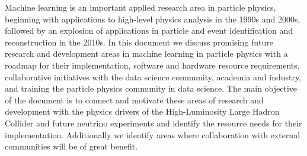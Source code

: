 Machine learning is an important applied research area in particle physics, beginning with applications to high-level physics analysis in the 1990s and 2000s, followed by an explosion of applications in particle and event identification and reconstruction in the 2010s.
In this document we discuss promising future research and development areas in machine learning in particle physics with a roadmap for their implementation, software and hardware resource requirements, collaborative initiatives with the data science community, academia and industry, and training the particle physics community in data science.
The main objective of the document is to connect and motivate these areas of research and development with the physics drivers of the High-Luminosity Large Hadron Collider and future neutrino experiments and identify the resource needs for their implementation.
Additionally we identify areas where collaboration with external communities will be of great benefit.
